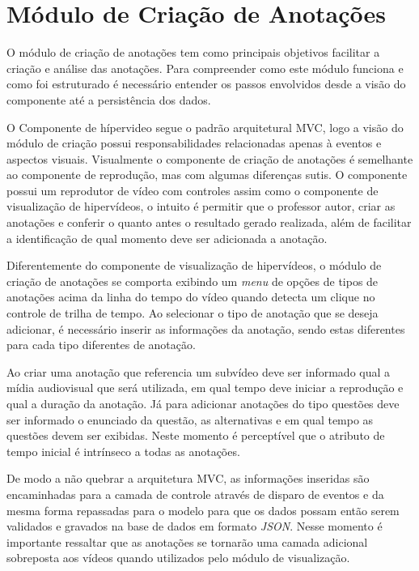 \section{Módulo de Criação de Anotações}

O módulo de criação de anotações tem como principais objetivos facilitar a criação e análise das anotações. Para compreender como este módulo funciona e como foi estruturado é necessário entender os passos envolvidos desde a visão do componente até a persistência dos dados.

O Componente de hípervideo segue o padrão arquitetural MVC, logo a visão do módulo de criação possui responsabilidades relacionadas apenas à eventos e aspectos visuais. Visualmente o componente de criação de anotações é semelhante ao componente de reprodução, mas com algumas diferenças sutis. O componente possui um reprodutor de vídeo com controles assim como o componente de visualização de hipervídeos, o intuito é permitir que o professor autor, criar as anotações e conferir o quanto antes o resultado gerado realizada, além de facilitar a identificação de qual momento deve ser adicionada a anotação.

Diferentemente do componente de visualização de hipervídeos, o módulo de criação de anotações se comporta exibindo um \textit{menu} de opções de tipos de anotações acima da linha do tempo do vídeo quando detecta um clique no controle de trilha de tempo. Ao selecionar o tipo de anotação que se deseja adicionar, é necessário inserir as informações da anotação, sendo estas diferentes para cada tipo diferentes de anotação.

Ao criar uma anotação que referencia um subvídeo deve ser informado qual a mídia audiovisual que será utilizada, em qual tempo deve iniciar a reprodução e qual a duração da anotação. Já para adicionar anotações do tipo questões deve ser informado o enunciado da questão, as alternativas e em qual tempo as questões devem ser exibidas. Neste momento é perceptível que o atributo de tempo inicial é intrínseco a todas as anotações.

De modo a não quebrar a arquitetura MVC, as informações inseridas são encaminhadas para a camada de controle através de disparo de eventos e da mesma forma repassadas para o modelo para que os dados possam então serem validados e gravados na base de dados em formato \textit{JSON}. Nesse momento é importante ressaltar que as anotações se tornarão uma camada adicional sobreposta aos vídeos quando utilizados pelo módulo de visualização.

